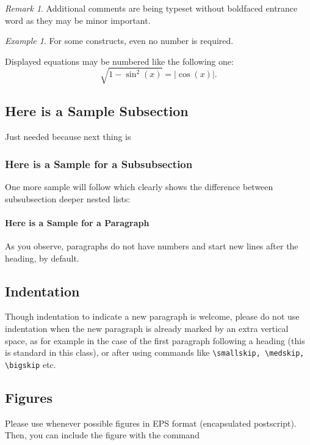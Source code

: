 \documentclass{birkjour}
\theoremstyle{definition}
\theoremstyle{remark}
\newtheorem{rem}[thm]{Remark}
\newtheorem*{ex}{Example}
\numberwithin{equation}{section}
\begin{document}
\begin{rem}
Additional comments are being typeset without boldfaced entrance
word as they may be minor important.
\end{rem}

\begin{ex}
For some constructs, even no number is required.
\end{ex}

Displayed equations may be numbered like the following one:
\begin{equation}
\sqrt{1-\sin^2(x)}=|\cos(x)|.
\end{equation}

\subsection{Here is a Sample Subsection}

Just needed because next thing is

\subsubsection{Here is a Sample for a Subsubsection}

One more sample will follow which clearly shows the difference between subsubsection deeper nested lists:

\paragraph{Here is a Sample for a Paragraph}

As you observe, paragraphs do not have numbers and start new lines after the heading, by default.

\subsection{Indentation}
Though indentation to indicate a new paragraph is welcome, please
do not use indentation when the new paragraph is already marked by
an extra vertical space, as for example in the case of the first
paragraph following a heading (this is standard in this class), or
after using commands like
\verb+\smallskip, \medskip, \bigskip+ etc.


\subsection{Figures}

Please use whenever possible figures in EPS format (encapsulated
postscript). Then, you can include the figure with
the command
\end{document}
